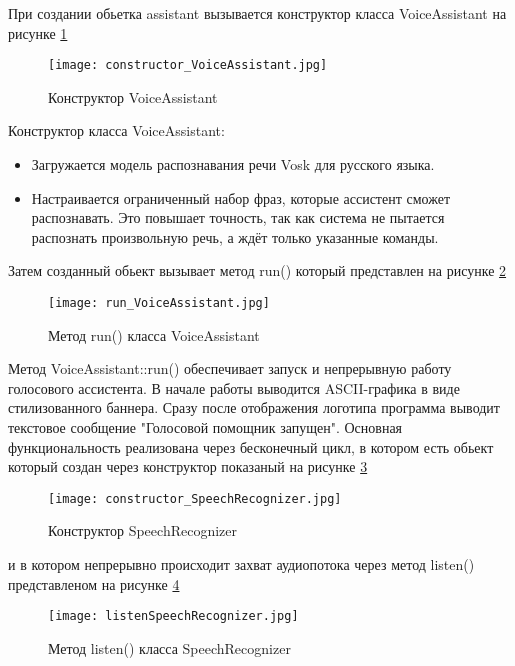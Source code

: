 При создании обьетка assistant вызывается конструктор класса VoiceAssistant на рисунке \ref{fig:constructor_VoiceAssistant}

\begin{figure}[H]
	\centering
	\texttt{[image: constructor\_VoiceAssistant.jpg]}
	\caption{Конструктор VoiceAssistant}
	\label{fig:constructor_VoiceAssistant}
\end{figure}

Конструктор класса VoiceAssistant:
\begin{itemize}
 	\item Загружается модель распознавания речи Vosk для русского языка.

	\item Настраивается ограниченный набор фраз, которые ассистент сможет распознавать. Это повышает точность, так как система не пытается распознать произвольную речь, а ждёт только указанные команды.
\end{itemize}

Затем созданный обьект вызывает метод run() который представлен на рисунке \ref{fig:run_VoiceAssistant}

\begin{figure}[H]
	\centering
	\texttt{[image: run\_VoiceAssistant.jpg]}
	\caption{Метод run() класса VoiceAssistant}
	\label{fig:run_VoiceAssistant}
\end{figure}

Метод VoiceAssistant::run() обеспечивает запуск и непрерывную работу голосового ассистента. В начале работы выводится ASCII-графика в виде стилизованного баннера. Сразу после отображения логотипа программа выводит текстовое сообщение "Голосовой помощник запущен". Основная функциональность реализована через бесконечный цикл, в котором есть обьект который создан через конструктор показаный на рисунке  \ref{fig:constructor_SpeechRecognizer}

\begin{figure}[H]
	\centering
	\texttt{[image: constructor\_SpeechRecognizer.jpg]}
	\caption{Конструктор SpeechRecognizer}
		\label{fig:constructor_SpeechRecognizer}
\end{figure}


и в котором непрерывно происходит захват аудиопотока через метод listen() представленом на рисунке \ref{fig:listenSpeechRecognizer}

\begin{figure}[H]
	\centering
	\texttt{[image: listenSpeechRecognizer.jpg]}
	\caption{Метод listen() класса SpeechRecognizer}
	\label{fig:listenSpeechRecognizer}
\end{figure}

